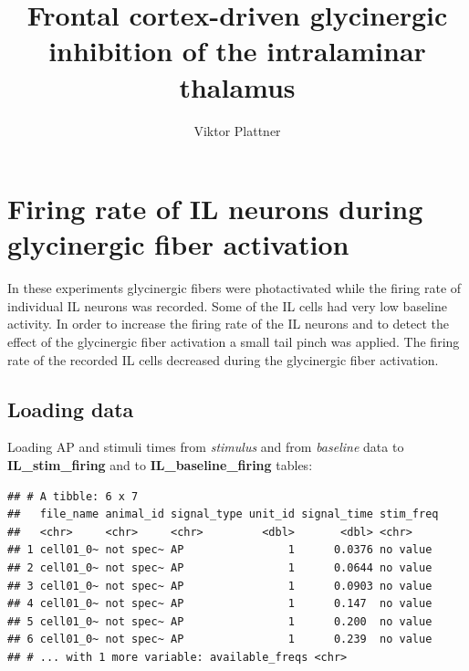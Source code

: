 \documentclass[12pt,]{article}
\title{Frontal cortex-driven glycinergic inhibition of the intralaminar
thalamus}
\author{Viktor Plattner}
\date{}
\newenvironment{Shaded}{\begin{snugshade}}{\end{snugshade}}
\newcommand{\DataTypeTok}[1]{\textcolor[rgb]{0.13,0.29,0.53}{#1}}
\newcommand{\KeywordTok}[1]{\textcolor[rgb]{0.13,0.29,0.53}{\textbf{#1}}}
\newcommand{\NormalTok}[1]{#1}
\newcommand{\OperatorTok}[1]{\textcolor[rgb]{0.81,0.36,0.00}{\textbf{#1}}}
\newcommand{\StringTok}[1]{\textcolor[rgb]{0.31,0.60,0.02}{#1}}
\begin{document}
\maketitle

{
\setcounter{tocdepth}{2}
\tableofcontents
}
\hypertarget{firing-rate-of-il-neurons-during-glycinergic-fiber-activation}{%
\section{Firing rate of IL neurons during glycinergic fiber
activation}\label{firing-rate-of-il-neurons-during-glycinergic-fiber-activation}}

In these experiments glycinergic fibers were photactivated while the
firing rate of individual IL neurons was recorded. Some of the IL cells
had very low baseline activity. In order to increase the firing rate of
the IL neurons and to detect the effect of the glycinergic fiber
activation a small tail pinch was applied. The firing rate of the
recorded IL cells decreased during the glycinergic fiber activation.

\hypertarget{loading-data}{%
\subsection{Loading data}\label{loading-data}}

Loading AP and stimuli times from \emph{stimulus} and from
\emph{baseline} data to \textbf{IL\_stim\_firing} and to
\textbf{IL\_baseline\_firing} tables:

\begin{Shaded}
\end{Shaded}

\begin{verbatim}
## # A tibble: 6 x 7
##   file_name animal_id signal_type unit_id signal_time stim_freq
##   <chr>     <chr>     <chr>         <dbl>       <dbl> <chr>    
## 1 cell01_0~ not spec~ AP                1      0.0376 no value 
## 2 cell01_0~ not spec~ AP                1      0.0644 no value 
## 3 cell01_0~ not spec~ AP                1      0.0903 no value 
## 4 cell01_0~ not spec~ AP                1      0.147  no value 
## 5 cell01_0~ not spec~ AP                1      0.200  no value 
## 6 cell01_0~ not spec~ AP                1      0.239  no value 
## # ... with 1 more variable: available_freqs <chr>
\end{verbatim}
\end{document}
